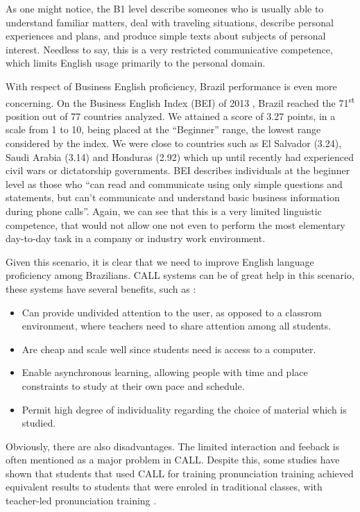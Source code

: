 As one might notice,  the B1 level describe someones who is usually able to understand familiar matters, deal with traveling situations, describe personal experiences and plans, and produce simple texts about subjects of personal interest. Needless to say, this is a very restricted communicative competence, which limits English usage primarily to the personal domain. 

With respect of Business English proficiency, Brazil performance is even more concerning. On the 
Business English Index (BEI) of 2013 \cite{BEI2013}, Brazil reached the 71\textsuperscript{st} position out of 77 countries analyzed. We attained a score of 3.27 points, in a scale from 1 to 10, being placed at the ``Beginner'' range, the lowest range considered by the index. We were close to countries such as El Salvador (3.24), Saudi Arabia (3.14) and Honduras (2.92) which up until recently had experienced civil wars or dictatorship governments. BEI describes individuals at the beginner level as those who ``can read and communicate using only simple questions and statements, but can't communicate and understand basic business information during phone calls''. Again, we can see that this is a very limited linguistic competence, that would not allow one not even to perform the most elementary day-to-day task in a company or industry work environment. 

Given this scenario, it is clear that we  need to improve English language proficiency among Brazilians. 
\ac{CALL} systems can be of great help in this scenario, these systems have several benefits, such as \cite{Witt1999}: 

\begin{itemize}
 \item Can provide undivided attention to the user, as opposed to a classrom environment, where teachers need to share attention among all students.
 \item Are cheap and scale well since students need is access to a computer.
 \item Enable asynchronous learning, allowing people with time and place constraints to study at their own pace and schedule.
 \item Permit high degree of individuality regarding the choice of material which is studied.
\end{itemize}

Obviously, there are also disadvantages. The limited interaction and feeback is often mentioned as a major problem in \ac{CALL}. Despite this, some studies have shown that students that used \ac{CALL} for training pronunciation training achieved equivalent results to students that were enroled in traditional classes, with teacher-led pronunciation training \cite{Neri2008, Stenson2013}.

